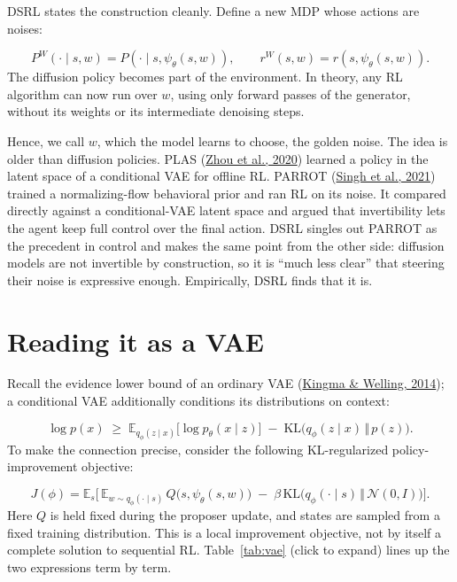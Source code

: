 DSRL states the construction cleanly. Define a new MDP whose actions are noises:

\begin{equation}
P^{W}(\cdot \mid s, w) = P(\cdot \mid s, \psi_\theta(s, w)), \qquad r^{W}(s, w) = r(s, \psi_\theta(s, w)).
\end{equation}
The diffusion policy becomes part of the environment. In theory, any RL algorithm can now run over $w$, using only forward passes of the generator, without its weights or its intermediate denoising steps.

Hence, we call $w$, which the model learns to choose, the golden noise. The idea is older than diffusion policies. PLAS (\hyperlink{ref:24}{Zhou et al., 2020}) learned a policy in the latent space of a conditional VAE for offline RL. PARROT (\hyperlink{ref:17}{Singh et al., 2021}) trained a normalizing-flow behavioral prior and ran RL on its noise. It compared directly against a conditional-VAE latent space and argued that invertibility lets the agent keep full control over the final action. DSRL singles out PARROT as the precedent in control and makes the same point from the other side: diffusion models are not invertible by construction, so it is ``much less clear'' that steering their noise is expressive enough. Empirically, DSRL finds that it is.

\section{Reading it as a VAE}
\label{sec:2}
Recall the evidence lower bound of an ordinary VAE (\hyperlink{ref:7}{Kingma \& Welling, 2014}); a conditional VAE additionally conditions its distributions on context:

\begin{equation}
\log p(x) \;\ge\; \mathbb{E}_{q_\phi(z \mid x)}\big[\log p_\theta(x \mid z)\big] \;-\; \mathrm{KL}\big(q_\phi(z \mid x) \,\Vert\, p(z)\big).
\end{equation}
To make the connection precise, consider the following KL-regularized policy-improvement objective:

\begin{equation}
J(\phi) = \mathbb{E}_{s}\Big[\, \mathbb{E}_{w \sim q_\phi(\cdot \mid s)}\, Q\big(s, \psi_\theta(s, w)\big) \;-\; \beta\, \mathrm{KL}\big(q_\phi(\cdot \mid s) \,\Vert\, \mathcal{N}(0, I)\big) \Big].
\end{equation}
Here $Q$ is held fixed during the proposer update, and states are sampled from a fixed training distribution. This is a local improvement objective, not by itself a complete solution to sequential RL. Table~\ref{tab:vae} (click to expand) lines up the two expressions term by term.

